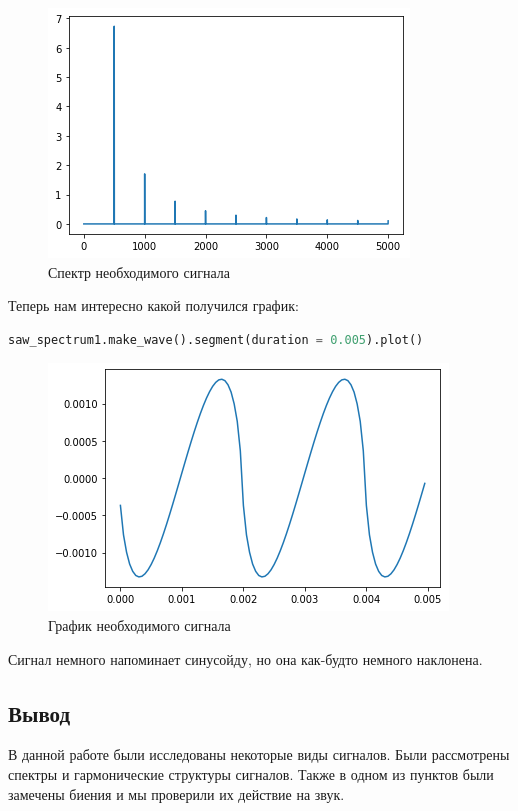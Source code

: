 \begin{figure}[H]
	\begin{center}
		\includegraphics[scale=1]{fig/lab02/lab02_47_0.png}
		\caption{Спектр необходимого сигнала}
	\end{center}
\end{figure}

Теперь нам интересно какой получился график:

\begin{lstlisting}[language=Python]
saw_spectrum1.make_wave().segment(duration = 0.005).plot()
\end{lstlisting}

\begin{figure}[H]
	\begin{center}
		\includegraphics[scale=1]{fig/lab02/lab02_49_0.png}
		\caption{График необходимого сигнала}
	\end{center}
\end{figure}

Сигнал немного напоминает синусойду, но она как-будто немного наклонена.

\subsection{Вывод}

В данной работе были исследованы некоторые виды сигналов. Были рассмотрены спектры и гармонические структуры сигналов. Также в одном из пунктов были замечены биения и мы проверили их действие на звук.